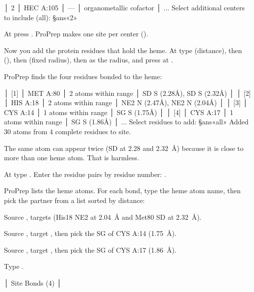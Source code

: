 \begin{steps}
\begin{screen}
│ 2      │ HEC A:105     │ —        │ organometallic cofactor   │
...
Select additional centers to include (all): §ans«2»
\end{screen}
  \item At  press . ProPrep makes one
        site per center ().
  \item Now you add the protein residues that hold the heme. At
         type  (distance), then
         (), then 
        (fixed radius), then  as the radius, and press 
        at .
  \item ProPrep finds the four residues bonded to the heme:
\begin{screen}
│ [1]    │ MET A:80 │ 2 atoms within range │ SD S (2.28Å), SD S (2.32Å)   │
│ [2]    │ HIS A:18 │ 2 atoms within range │ NE2 N (2.47Å), NE2 N (2.04Å) │
│ [3]    │ CYS A:14 │ 1 atoms within range │ SG S (1.75Å)                 │
│ [4]    │ CYS A:17 │ 1 atoms within range │ SG S (1.86Å)                 │
...
Select residues to add: §ans«all»
Added 30 atoms from 4 complete residues to site.
\end{screen}
        The same atom can appear twice (SD at 2.28 and 2.32~\AA) because it
        is close to more than one heme atom. That is harmless.
  \item At  type . Enter the
        residue pairs by residue number:
        .
  \item ProPrep lists the heme atoms. For each bond, type the heme atom name,
        then pick the partner from a list sorted by distance:
  \begin{steps}
    \item Source , targets  (His18 NE2 at 2.04~\AA{} and
          Met80 SD at 2.32~\AA).
    \item Source , target , then pick the SG of
          \textsf{CYS A:14} (1.75~\AA).
    \item Source , target , then pick the SG of
          \textsf{CYS A:17} (1.86~\AA).
    \item Type .
  \end{steps}
\begin{screen}
│ Site Bonds (4)                                                │

\end{screen}
\end{steps}
